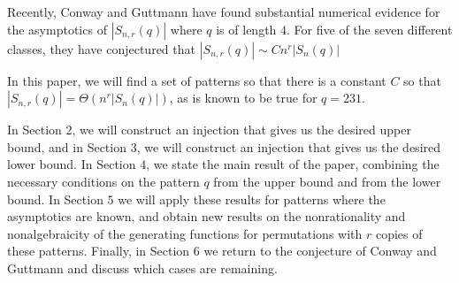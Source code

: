 \documentclass[11pt, final]{amsart}
\theoremstyle{remark}
\numberwithin{equation}{section}
\begin{document}
Recently, Conway and Guttmann \cite{Conway} have found substantial numerical evidence for the asymptotics of $|S_{n,r}(q)|$ where $q$ is of length $4$. For five of the seven different classes, they have conjectured that $|S_{n,r}(q)| \sim C n^r |S_{n}(q)|$

In this paper, we will find a set of patterns so that there is a constant $C$ so that $|S_{n,r}(q)| = \Theta(n^r |S_{n}(q)|)$, as is known to be true for $q = 231$.

In Section 2, we will construct an injection that gives us the desired upper bound, and in Section $3$, we will construct an injection that gives us the desired lower bound. In Section $4$, we state the main result of the paper, combining the necessary conditions on the pattern $q$ from the upper bound and from the lower bound. In Section $5$ we will apply these results for patterns where the asymptotics are known, and obtain new results on the nonrationality and nonalgebraicity of the generating functions for permutations with $r$ copies of these patterns. Finally, in Section $6$ we return to the conjecture of Conway and Guttmann \cite{Conway} and discuss which cases are remaining.





\end{document}
